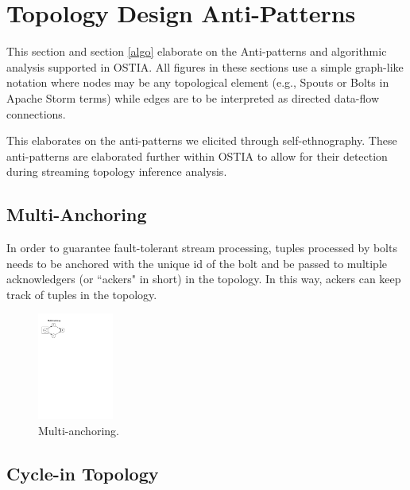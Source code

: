 \section{Topology Design Anti-Patterns}

This section and section \ref{algo} elaborate on the Anti-patterns and algorithmic analysis supported in OSTIA. All figures in these sections use a simple graph-like notation where nodes may be any topological element (e.g., Spouts or Bolts in Apache Storm terms) while edges are to be interpreted as directed data-flow connections.

\label{sec:anti-pattern}
This elaborates on the anti-patterns we elicited through self-ethnography. These anti-patterns are elaborated further within OSTIA to allow for their detection during streaming topology inference analysis.

\subsection{Multi-Anchoring}
In order to guarantee fault-tolerant stream processing, tuples processed by bolts needs to be anchored with the unique id of the bolt and be passed to multiple acknowledgers (or ``ackers" in short) in the topology. In this way, ackers can keep track of tuples in the topology.\\

\begin{figure}[H]
	\begin{center}
		\includegraphics[width=2.5cm]{images/multi-anchoring}
		\caption{Multi-anchoring.}
		\label{fig:multi-anchoring}
	\end{center}
\end{figure}

\subsection{Cycle-in Topology}

